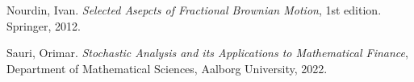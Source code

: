 \documentclass[11pt,a4paper,twoside,openright,english]{book}
\begin{document}
\frontmatter





\mainmatter

%









% 
% 

%

\backmatter


%
%
\begin{thebibliography}{}
Nourdin, Ivan. \textit{Selected Asepcts of Fractional Brownian Motion}, 1st edition. Springer, 2012.

Sauri, Orimar. \textit{Stochastic Analysis and its Applications to Mathematical Finance}, Department of Mathematical Sciences, Aalborg University, 2022.
\end{thebibliography}{}
\end{document}
